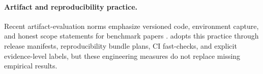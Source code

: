 \paragraph{Artifact and reproducibility practice.}
Recent artifact-evaluation norms emphasize versioned code, environment capture, and honest scope statements for benchmark papers \citep{liang2023holisticevaluationlanguagemodels}. \CAB{} adopts this practice through release manifests, reproducibility bundle plans, CI fast-checks, and explicit evidence-level labels, but these engineering measures do not replace missing empirical results.

